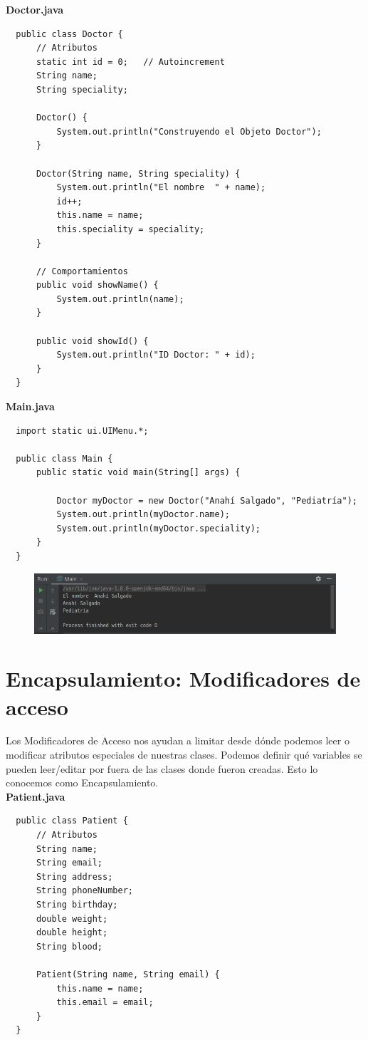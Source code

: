 \documentclass{article}
\begin{document}
\textbf{Doctor.java}
\begin{verbatim}
  public class Doctor {
      // Atributos
      static int id = 0;   // Autoincrement
      String name;
      String speciality;

      Doctor() {
          System.out.println("Construyendo el Objeto Doctor");
      }

      Doctor(String name, String speciality) {
          System.out.println("El nombre  " + name);
          id++;
          this.name = name;
          this.speciality = speciality;
      }

      // Comportamientos
      public void showName() {
          System.out.println(name);
      }

      public void showId() {
          System.out.println("ID Doctor: " + id);
      }
  }
\end{verbatim}

\textbf{Main.java}
\begin{verbatim}
  import static ui.UIMenu.*;

  public class Main {
      public static void main(String[] args) {

          Doctor myDoctor = new Doctor("Anahí Salgado", "Pediatría");
          System.out.println(myDoctor.name);
          System.out.println(myDoctor.speciality);
      }
  }
\end{verbatim}

\begin{figure}[h!]
  \centering
  \includegraphics[scale=0.75]{./Pictures/029_sobrecarga_constructor.png}
\end{figure}


\section{Encapsulamiento: Modificadores de acceso}%
Los Modificadores de Acceso nos ayudan a limitar desde dónde podemos leer o
modificar atributos especiales de nuestras clases. Podemos definir qué
variables se pueden leer/editar por fuera de las clases donde fueron creadas.
Esto lo conocemos como Encapsulamiento.\\

\textbf{Patient.java}
\begin{verbatim}
  public class Patient {
      // Atributos
      String name;
      String email;
      String address;
      String phoneNumber;
      String birthday;
      double weight;
      double height;
      String blood;

      Patient(String name, String email) {
          this.name = name;
          this.email = email;
      }
  }
\end{verbatim}
\end{document}
